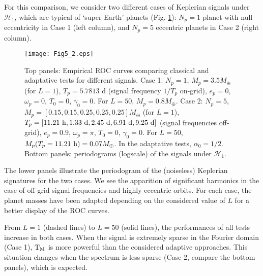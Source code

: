 \documentclass[journal]{IEEEtran}
\begin{document}
 { For this comparison, we consider two different cases of Keplerian signals under $\mathcal{H}_1$, which are typical of `super-Earth' planets (Fig. \ref{Fig5}):  $N_p = 1$ planet with null eccentricity in Case 1 (left column), and $N_p = 5$ eccentric planets in Case 2 (right column). 
 \begin{figure}[htb!]  \centering
	\texttt{[image: Fig5\_2.eps]}
	\caption{ { Top panels: Empirical ROC curves comparing classical and adaptative tests for different signals.
	 Case 1:  $N_p = 1$, $M_p = 3.5 M_\oplus$ (for $L=1$), $T_p = 5.7813$ d (signal frequency $1/T_p$ on-grid), $e_p=0$, $\omega_p=0$, $T_0=0$, $\gamma_0= 0$. For $L = 50$, $M_p = 0.8 M_\oplus$. 
	Case 2: $N_p = 5$, $M_p =  [0.15,0.15,0.25,0.25,0.25]  M_\oplus$ (for $L=1$), $T_p = [11.21~ {\rm h}, 1.33 ~ {\rm d}, 2.45~ {\rm d}, 6.91 ~ {\rm d}, 9.25~ {\rm d}] $ (signal frequencies off-grid), $e_p=0.9$, $\omega_p=\pi$, $T_0=0$, $\gamma_0= 0$. For $L = 50$,  $M_p(T_p = 11.21~ {\rm h}) = 0.07 M_\oplus$. 
	 In  the adaptative tests,   $\alpha_0=1/2$.  Bottom panels: periodograms (logscale) of the signals under ${\mathcal{H}}_1$.}}
	\label{Fig5}
\end{figure} 

 
 
 The lower panels illustrate the periodogram of the (noiseless) Keplerian signatures for the two cases. We see the apparition of significant harmonic{s} in the case of off-grid signal frequencies and highly eccentric  orbits. For each case, the planet masses have been adapted depending on the considered value of $L$  for a better display of the ROC curves.
 
 From $L=1$ (dashed lines) to $L=50$ (solid lines),  the performances of all  tests increase in both cases.  When the signal is extremely sparse in the Fourier domain (Case 1), ${\rm T_M}$ is more powerful than the considered adaptive approaches. This situation  changes when the spectrum is less sparse (Case 2,  compare the bottom panels), which is expected. 
 
}
\end{document}

